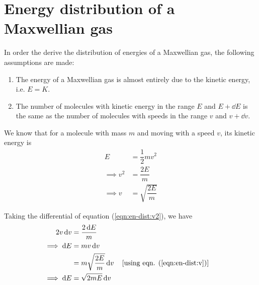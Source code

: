 \section{Energy distribution of a Maxwellian gas}
	\setcounter{equation}{0}
	In order the derive the distribution of energies of a Maxwellian gas, the following assumptions are made:
	\begin{enumerate}
		\item The energy of a Maxwellian gas is almost entirely due to the kinetic energy, i.e. $E=K$.
		
		\item The number of molecules with kinetic energy in the range $E$ and $E+\dd{E}$ is the same as the number of molecules with speeds in the range $v$ and $v+\dd{v}$.
	\end{enumerate}
	
	We know that for a molecule with mass $m$ and moving with a speed $v$, its kinetic energy is
	\begin{align}
		E&=\dfrac{1}{2}mv^2 \nonumber\\
		\implies v^2&=\dfrac{2E}{m} \label{eqn:en-dist:v2}\\
		\implies v&=\sqrt{\dfrac{2E}{m}} \label{eqn:en-dist:v}
	\end{align}
	
	Taking the differential of equation (\ref{eqn:en-dist:v2}), we have
	\begin{align}
		2v\dd{v}&=\dfrac{2\dd{E}}{m} \nonumber\\
		\implies\dd{E}&=mv\dd{v} \nonumber\\
			&=m\sqrt{\dfrac{2E}{m}}\dd{v}\qq{[using eqn. (\ref{eqn:en-dist:v})]}\nonumber\\
		\implies\dd{E}&=\sqrt{2mE}\dd{v} \label{eqn:en-dist:dE}
	\end{align}
	
